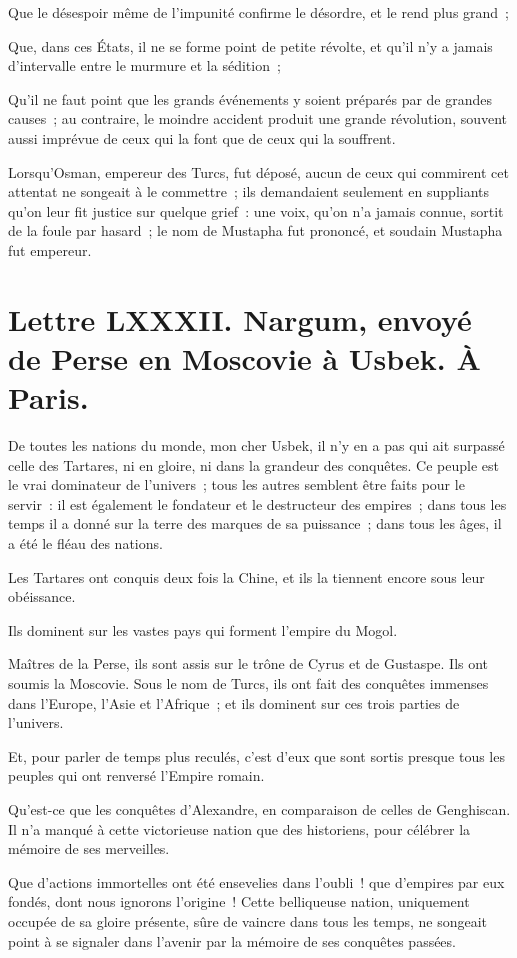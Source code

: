 \documentclass[french,twoside]{book} %
\newcommand{\dateline}[1]{\medskip{\RaggedLeft{#1}\par}\bigskip}
\begin{document}
Que le désespoir même de l’impunité confirme le désordre, et le rend plus grand ;\par
Que, dans ces États, il ne se forme point de petite révolte, et qu’il n’y a jamais d’intervalle entre le murmure et la sédition ;\par
Qu’il ne faut point que les grands événements y soient préparés par de grandes causes ; au contraire, le moindre accident produit une grande révolution, souvent aussi imprévue de ceux qui la font que de ceux qui la souffrent.\par
Lorsqu’Osman, empereur des Turcs, fut déposé, aucun de ceux qui commirent cet attentat ne songeait à le commettre ; ils demandaient seulement en suppliants qu’on leur fit justice sur quelque grief : une voix, qu’on n’a jamais connue, sortit de la foule par hasard ; le nom de Mustapha fut prononcé, et soudain Mustapha fut empereur.\par

\dateline{De Paris, le 2 de la lune de Rebiab I, 1715.}
\section[{Lettre LXXXII. Nargum, envoyé de Perse en Moscovie à Usbek. À Paris.}]{Lettre LXXXII. Nargum, envoyé de Perse en Moscovie à Usbek. À Paris.}\renewcommand{\leftmark}{Lettre LXXXII. Nargum, envoyé de Perse en Moscovie à Usbek. À Paris.}

\noindent De toutes les nations du monde, mon cher Usbek, il n’y en a pas qui ait surpassé celle des Tartares, ni en gloire, ni dans la grandeur des conquêtes. Ce peuple est le vrai dominateur de l’univers ; tous les autres semblent être faits pour le servir : il est également le fondateur et le destructeur des empires ; dans tous les temps il a donné sur la terre des marques de sa puissance ; dans tous les âges, il a été le fléau des nations.\par
Les Tartares ont conquis deux fois la Chine, et ils la tiennent encore sous leur obéissance.\par
Ils dominent sur les vastes pays qui forment l’empire du Mogol.\par
Maîtres de la Perse, ils sont assis sur le trône de Cyrus et de Gustaspe. Ils ont soumis la Moscovie. Sous le nom de Turcs, ils ont fait des conquêtes immenses dans l’Europe, l’Asie et l’Afrique ; et ils dominent sur ces trois parties de l’univers.\par
Et, pour parler de temps plus reculés, c’est d’eux que sont sortis presque tous les peuples qui ont renversé l’Empire romain.\par
Qu’est-ce que les conquêtes d’Alexandre, en comparaison de celles de Genghiscan. Il n’a manqué à cette victorieuse nation que des historiens, pour célébrer la mémoire de ses merveilles.\par
Que d’actions immortelles ont été ensevelies dans l’oubli ! que d’empires par eux fondés, dont nous ignorons l’origine ! Cette belliqueuse nation, uniquement occupée de sa gloire présente, sûre de vaincre dans tous les temps, ne songeait point à se signaler dans l’avenir par la mémoire de ses conquêtes passées.\par
\end{document}
